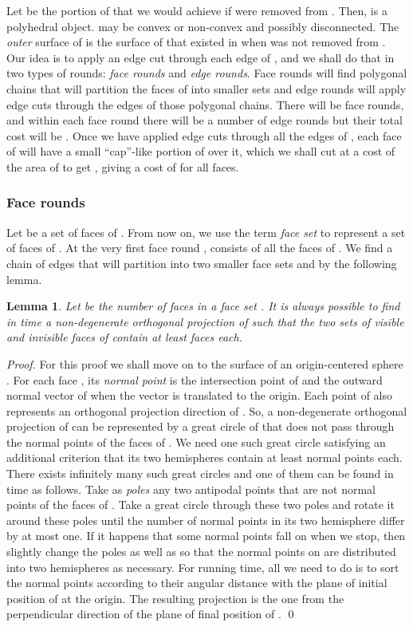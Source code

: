 \documentclass{llncs}
\newtheorem{lem}{Lemma}
\begin{document}
Let  be the portion of  that we would achieve if  were removed from .
Then,  is a polyhedral object.  may be convex or non-convex and possibly disconnected.
The \emph{outer} surface of  is the surface of  that existed in  when  was not removed from .
Our idea is to apply an edge cut through each edge of , 
and we shall do that in two types of rounds: \emph{face rounds} and \emph{edge rounds}.
Face rounds will find polygonal chains that will partition the faces of   into smaller 
sets and edge rounds will apply edge cuts through the edges of those polygonal chains.
There will be  face rounds,
and within each face round there will be a number of edge rounds but their total cost will be . 
Once we have applied edge cuts through all the edges of , each face  of  will have a small ``cap''-like
portion of  over it, which we shall cut at a cost of the area of  to get , 
giving a cost of  for all faces.

\subsubsection{Face rounds}
Let  be a set of faces of .
From now on, we use the term \emph{face set} to represent a set of faces of .
At the very first face round ,  consists of all the faces of .
We find a chain of edges  that will partition  into two smaller
face sets  and  by the following lemma.


\begin{lem}
\label{le:face_equal_partition}
Let  be the number of faces in a face set .
It is always possible to find in  time a non-degenerate orthogonal projection of  
such that the two sets of visible and invisible faces of  
contain at least  faces each.
\end{lem}

\begin{proof}
For this proof we shall move on to the surface of an origin-centered sphere .
For each face , its  \emph{normal point} is the intersection point of  
and the outward normal vector of  when the vector is translated to the origin.
Each point of  also represents an orthogonal projection direction of .
So, a non-degenerate orthogonal projection of  can be represented 
by a great circle of  that does not pass through the normal points of the faces of .
We need one such great circle satisfying an additional criterion that its two hemispheres contain 
at least  normal points each.
There exists infinitely many such great circles and one of them can be found in  time
as follows. 
Take as \emph{poles} any two antipodal points that are not normal points of the faces of .
Take a great circle  through these two poles and rotate it around these poles until 
the number of normal points in its two hemisphere differ by at most one.
If it happens that some normal points fall on  when we stop,
then slightly change the poles as well as  so that the normal points on  are distributed into two hemispheres as necessary.
For running time, all we need to do is to sort the normal points according to their angular distance 
with the plane of initial position of  at the origin.
The resulting projection is the one from the perpendicular direction of the plane of final position of .
\qed
\end{proof}
\end{document}
